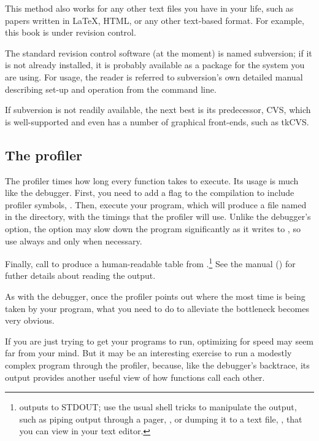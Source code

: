 \documentclass[12pt]{article}
\def\ind#1{\index{#1}#1}
\begin{document}
This method also works for any other text files you have in your
life, such as papers written in \LaTeX, HTML, or any other text-based
format. For example, this book is under revision control.

The standard revision control software (at the moment) is named
subversion; if it is not already installed, it is probably available as
a package for the system you are using. For usage, the reader is referred
to subversion's own detailed manual describing set-up and operation from
the command line.

If subversion is not readily available, the next best is its predecessor,
CVS, which is well-supported and even has a number of graphical
front-ends, such as tkCVS.  

\subsection{The \ind{profiler}} The profiler times how long every function
takes to execute. Its usage is much like the debugger. First, you need
to add a flag to the compilation to include profiler symbols,
. Then, execute your program, which will produce a file named
 in the directory, with the timings that the profiler
will use. Unlike the debugger's  option, the 
option may slow down the program significantly as it writes to
, so use  always and  only
when necessary.

Finally, call  to produce a
human-readable table from .\footnote{
outputs to \ind{STDOUT}; use the usual shell tricks to manipulate
the output, such as piping output through a pager, , or dumping it to a text file, , that you can view in your text editor.}
See the manual () for futher details about reading
the output.

As with the debugger, once the profiler points out where the most time
is being taken by your program, what you need to do to alleviate the
bottleneck becomes very obvious.

If you are just trying to get your programs to run, optimizing for speed 
may seem far from your mind. But it may be an interesting exercise to
run a modestly complex program through the profiler, because, like the
debugger's backtrace, its output provides another useful view of how
functions call each other.
\end{document}
